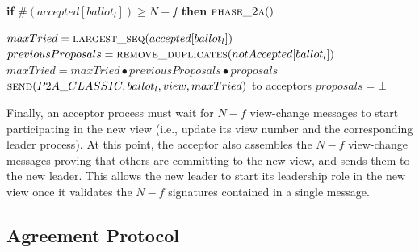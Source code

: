 \begin{algorithm}
\begin{algorithmic}[1]
		\State 
		\State \hspace{\algorithmicindent}\hspace{\algorithmicindent} \textbf{if} $\#(accepted[ballot_l]) \geq N-f$ \textbf{then} 
		\State \hspace{\algorithmicindent}\hspace{\algorithmicindent}\hspace{\algorithmicindent} $\Call{phase\_2a}{ }$
		
		\State
		\State $maxTried = \Call{largest\_seq}{accepted[ballot_l]}$
		\State $previousProposals = \Call{remove\_duplicates}{notAccepted[ballot_l]}$
		\State $maxTried = maxTried \bullet previousProposals \bullet proposals$
		\State $\Call{send}{P2A\_CLASSIC,ballot_l,view, maxTried}$ to acceptors
		\State $proposals = \bot$
		\EndFunction
		
	\end{algorithmic}
\end{algorithm}

Finally, an acceptor process must wait for $N-f$ view-change messages to start participating in the new view (i.e., update its view number and the corresponding leader process). At this point, the acceptor also assembles the $N-f$ view-change messages proving that others are committing to the new view, and sends them to the new leader. This allows the new leader to start its leadership role in the new view once it validates the $N-f$ signatures contained in a single message.

\subsection{Agreement Protocol} 

